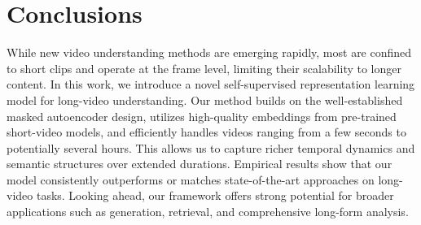 \vspace{-0.4em}
\section{Conclusions}
\label{sec:conclusions}
\vspace{-0.4em}

While new video understanding methods are emerging rapidly, most are confined to short clips and operate at the frame level, limiting their scalability to longer content. In this work, we introduce a novel self-supervised representation learning model for long-video understanding. Our method builds on the well-established masked autoencoder design, utilizes high-quality embeddings from pre-trained short-video models, and efficiently handles videos ranging from a few seconds to potentially several hours. This allows us to capture richer temporal dynamics and semantic structures over extended durations. Empirical results show that our model consistently outperforms or matches state-of-the-art approaches on long-video tasks. Looking ahead, our framework offers strong potential for broader applications such as generation, retrieval, and comprehensive long-form analysis.

\clearpage